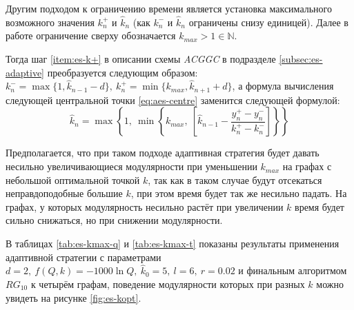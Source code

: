 Другим подходом к ограничению времени является установка максимального возможного значения $k_n^{+}$ и $\hat{k}_n$ (как $k_n^{-}$ и $\hat{k}_n$ ограничены снизу единицей). Далее в работе ограничение сверху обозначается $k_{max} > 1 \in \mathbb{N}$.

Тогда шаг \ref{item:es-k+} в описании схемы \emph{ACGGC} в подразделе \ref{subsec:es-adaptive} преобразуется следующим образом: $k_n^{-} = \max\{1, \hat{k}_{n - 1} - d\},\ k_n^{+} = \min \{k_{max}, \hat{k}_{n + 1} + d\}$, а формула вычисления следующей центральной точки \eqref{eq:aes-centre} заменится следующей формулой:
\begin{equation}
	\hat{k}_n = \max \left\{1,\ \min \left\{k_{max},\ \left[\hat{k}_{n - 1} - \frac{y_n^{+} - y_n^{-}}{k_n^{+} - k_n^{-}}\right] \right\} \right\}
\end{equation}

Предполагается, что при таком подходе адаптивная стратегия будет давать несильно увеличивающиеся модулярности при уменьшении $k_{max}$ на графах с небольшой оптимальной точкой $k$, так как в таком случае будут отсекаться неправдоподобные большие $k$, при этом время будет так же несильно падать. На графах, у которых модулярность несильно растёт при увеличении $k$ время будет сильно снижаться, но при снижении модулярности.

В таблицах \ref{tab:es-kmax-q} и \ref{tab:es-kmax-t} показаны результаты применения адаптивной стратегии с параметрами $d = 2,\ f(Q, k) = -1000 \ln Q,\ \hat{k}_0 = 5,\ l = 6,\ r = 0.02$ и финальным алгоритмом $RG_{10}$ к четырём графам, поведение модулярности которых при разных $k$ можно увидеть на рисунке \ref{fig:es-kopt}.

